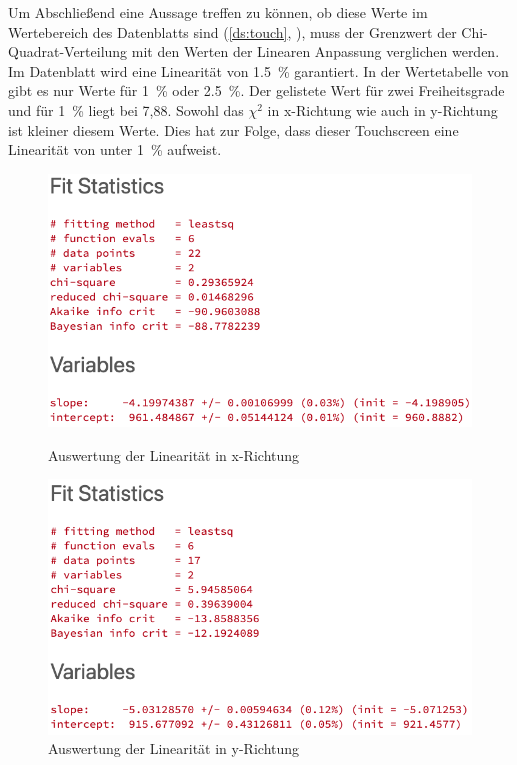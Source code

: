 Um Abschließend eine Aussage treffen zu können, ob diese Werte im Wertebereich des Datenblatts sind (\cref{ds:touch}, ), muss der Grenzwert der Chi-Quadrat-Verteilung mit den Werten der Linearen Anpassung verglichen werden.
Im Datenblatt wird eine Linearität von \SI{1,5}{\%} garantiert.
In der Wertetabelle von \cite{papula} gibt es nur Werte für \SI{1}{\%} oder \SI{2,5}{\%}.
Der gelistete Wert für zwei Freiheitsgrade und für \SI{1}{\%} liegt bei 7,88.
Sowohl das \(\chi^2\) in x-Richtung wie auch in y-Richtung ist kleiner diesem Werte.
Dies hat zur Folge, dass dieser Touchscreen eine Linearität von unter \SI{1}{\%} aufweist.
\begin{figure}
    \begin{minipage}{0.49\linewidth}
        \centering
        \includegraphics[width=\linewidth]{fig/xfit.png}
        \caption{Auswertung der Linearität in x-Richtung}
        \label{fig:xfit}
    \end{minipage}
    \begin{minipage}{0.49\linewidth}
        \centering
        \includegraphics[width=\linewidth]{fig/yfit.png}
        \caption{Auswertung der Linearität in y-Richtung}
        \label{fig:yfit}
    \end{minipage}
\end{figure} 
